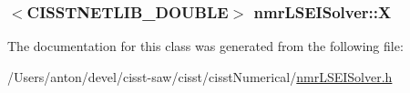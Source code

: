 \subsubsection[{X}]{$<$C\+I\+S\+S\+T\+N\+E\+T\+L\+I\+B\+\_\+\+D\+O\+U\+B\+L\+E$>$ nmr\+L\+S\+E\+I\+Solver\+::\+X\hspace{0.3cm}{\ttfamily [protected]}}\label{classnmr_l_s_e_i_solver_ab5f8afa5ce2709553fb43e161f05273d}


The documentation for this class was generated from the following file\+:\begin{DoxyCompactItemize}
\item 
/\+Users/anton/devel/cisst-\/saw/cisst/cisst\+Numerical/\hyperlink{nmr_l_s_e_i_solver_8h}{nmr\+L\+S\+E\+I\+Solver.\+h}\end{DoxyCompactItemize}
